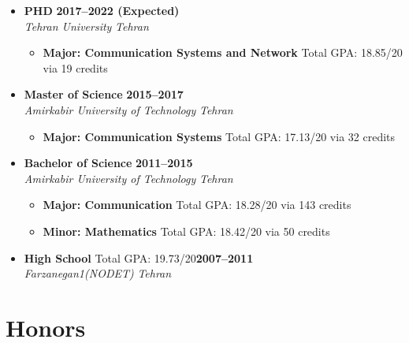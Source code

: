 \documentclass[10pt,a4paper,sans]{moderncv} %
\begin{document}
\begin{itemize}
\item \textbf{PHD} \hfill \textbf{2017--2022 (Expected)} \\
\emph{Tehran University} \hfill \emph{Tehran}
\begin{itemize}
\item \textbf{Major: Communication Systems and Network}\hspace{10 pt} Total GPA: 18.85/20 via 19 credits
\end{itemize}

\item \textbf{Master of Science} \hfill \textbf{2015--2017 } \\
\emph{Amirkabir University of Technology} \hfill \emph{Tehran}
\begin{itemize}
\item \textbf{Major: Communication Systems}\hspace{10 pt} Total GPA: 17.13/20 via 32 credits
\end{itemize}

\item \textbf{Bachelor of Science} \hfill \textbf{2011--2015} \\
\emph{Amirkabir University of Technology} \hfill \emph{Tehran}

\begin{itemize}
\item \textbf{Major: Communication} \hspace{10 pt} Total GPA: 18.28/20 via 143 credits
\item \textbf{Minor: Mathematics} \hspace{36 pt}  Total GPA: 18.42/20  via 50 credits 
\end{itemize}

\item \textbf{High School} \hspace{80 pt} Total GPA: 19.73/20\hfill \textbf{2007--2011} \\
\emph{Farzanegan1(NODET)} \hfill \emph{Tehran}

\end{itemize}


\section{Honors}
\end{document}
